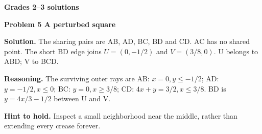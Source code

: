 \documentclass[letterpaper,11pt]{article}
\begin{document}
\vspace{.15in}
\newpage
{\Large\bfseries Grades 2--3 solutions}\par
\vspace{.08in}
{\large\bfseries Problem 5 A perturbed square}\par
\vspace{3pt}
\noindent\begin{minipage}[t]{.58\textwidth}\vspace{0pt}
\fontsize{10.8}{13.2}\selectfont
\textbf{Solution.} The sharing pairs are AB, AD, BC, BD and CD. AC has no shared point. The short BD edge joins $U=(0,-1/2)$ and $V=(3/8,0)$. U belongs to ABD; V to BCD.

\textbf{Reasoning.} The surviving outer rays are AB: $x=0,y\leq-1/2$; AD: $y=-1/2,x\leq0$; BC: $y=0,x\geq3/8$; CD: $4x+y=3/2,x\leq3/8$. BD is $y=4x/3-1/2$ between U and V.

\textbf{Hint to hold.} Inspect a small neighborhood near the middle, rather than extending every crease forever.


\end{minipage}
\end{document}
